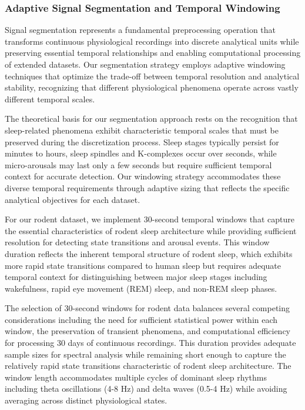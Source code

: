 \documentclass[a4paper,12pt,twoside]{article}
\begin{document}
\subsubsection{Adaptive Signal Segmentation and Temporal Windowing}

Signal segmentation represents a fundamental preprocessing operation that transforms continuous physiological recordings into discrete analytical units while preserving essential temporal relationships and enabling computational processing of extended datasets. Our segmentation strategy employs adaptive windowing techniques that optimize the trade-off between temporal resolution and analytical stability, recognizing that different physiological phenomena operate across vastly different temporal scales.

The theoretical basis for our segmentation approach rests on the recognition that sleep-related phenomena exhibit characteristic temporal scales that must be preserved during the discretization process. Sleep stages typically persist for minutes to hours, sleep spindles and K-complexes occur over seconds, while micro-arousals may last only a few seconds but require sufficient temporal context for accurate detection. Our windowing strategy accommodates these diverse temporal requirements through adaptive sizing that reflects the specific analytical objectives for each dataset.

For our rodent dataset, we implement 30-second temporal windows that capture the essential characteristics of rodent sleep architecture while providing sufficient resolution for detecting state transitions and arousal events. This window duration reflects the inherent temporal structure of rodent sleep, which exhibits more rapid state transitions compared to human sleep but requires adequate temporal context for distinguishing between major sleep stages including wakefulness, rapid eye movement (REM) sleep, and non-REM sleep phases.

The selection of 30-second windows for rodent data balances several competing considerations including the need for sufficient statistical power within each window, the preservation of transient phenomena, and computational efficiency for processing 30 days of continuous recordings. This duration provides adequate sample sizes for spectral analysis while remaining short enough to capture the relatively rapid state transitions characteristic of rodent sleep architecture. The window length accommodates multiple cycles of dominant sleep rhythms including theta oscillations (4-8 Hz) and delta waves (0.5-4 Hz) while avoiding averaging across distinct physiological states.
\end{document}

